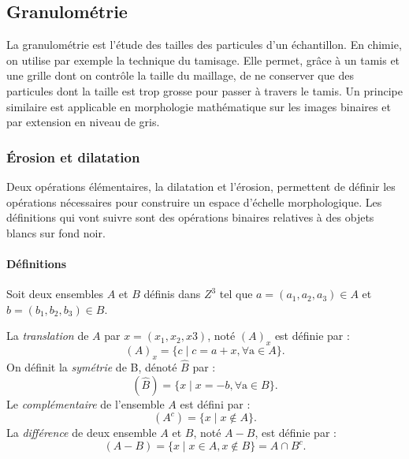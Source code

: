   \subsection{Granulométrie}
  \label{sec:EA:rehaussement:echelle:granulometrie}
  
  La granulométrie est l'étude des tailles des particules d'un échantillon. En chimie, on utilise par exemple la technique du tamisage. Elle permet, grâce à un tamis et une grille dont on contrôle la taille du maillage, de ne conserver que des particules dont la taille est trop grosse pour passer à travers le tamis. Un principe similaire est applicable en morphologie mathématique sur les images binaires et par extension en niveau de gris.
  
  \subsubsection{Érosion et dilatation}
  
  Deux opérations élémentaires, la dilatation et l'érosion, permettent de définir les opérations nécessaires pour construire un espace d'échelle morphologique. Les définitions qui vont suivre sont des opérations binaires relatives à des objets blancs sur fond noir.
  
  \paragraph{Définitions}
  
  Soit deux ensembles $A$ et $B$ définis dans $Z^3$ tel que $a=(a_1,a_2,a_3)  \in A$ et $b=(b_1,b_2,b_3) \in B$.
  
  La \emph{translation} de $A$ par $x = (x_1,x_2,x3)$, noté $(A)_x$ est définie par :
  \begin{equation}
    (A)_x = \{c \mid c = a+x, \forall \text{a} \in A\}. 
    \label{eq:morpho_translation}
  \end{equation}
  On définit la \emph{symétrie} de B, dénoté $\widehat{B}$ par :
  \begin{equation}
    (\widehat{B}) = \{x \mid x = -b, \forall \text{a} \in B\}. 
    \label{eq:morpho_symmetry}
  \end{equation}
  Le \emph{complémentaire} de l'ensemble $A$ est défini par :
  \begin{equation}
    (A^c) = \{x \mid x \not\in A\}. 
    \label{eq:morpho_complementary}
  \end{equation}
  La \emph{différence} de deux ensemble $A$ et $B$, noté $A - B$, est définie par :
  \begin{equation}
    (A-B) = \{x \mid x \in A, x\not\in B \} = A \cap B^c.
    \label{eq:morpho_difference}  
  \end{equation}
  
